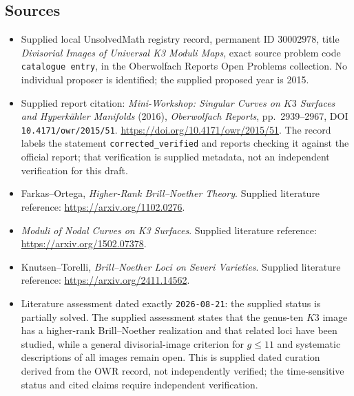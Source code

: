 \documentclass[11pt]{article}
\begin{document}
\subsection{Sources}
\begin{itemize}
\item Supplied local UnsolvedMath registry record, permanent ID \(30002978\), title \emph{Divisorial Images of Universal K3 Moduli Maps}, exact source problem code \texttt{catalogue entry}, in the Oberwolfach Reports Open Problems collection. No individual proposer is identified; the supplied proposed year is 2015.
\item Supplied report citation: \emph{Mini-Workshop: Singular Curves on \(K3\) Surfaces and Hyperkähler Manifolds} (2016), \emph{Oberwolfach Reports}, pp.\ 2939--2967, DOI \texttt{10.4171/owr/2015/51}. \url{https://doi.org/10.4171/owr/2015/51}. The record labels the statement \texttt{corrected\_verified} and reports checking it against the official report; that verification is supplied metadata, not an independent verification for this draft.
\item Farkas--Ortega, \emph{Higher-Rank Brill--Noether Theory}. Supplied literature reference: \url{https://arxiv.org/1102.0276}.
\item \emph{Moduli of Nodal Curves on K3 Surfaces}. Supplied literature reference: \url{https://arxiv.org/1502.07378}.
\item Knutsen--Torelli, \emph{Brill--Noether Loci on Severi Varieties}. Supplied literature reference: \url{https://arxiv.org/2411.14562}.
\item Literature assessment dated exactly \texttt{2026-08-21}: the supplied status is partially solved. The supplied assessment states that the genus-ten \(K3\) image has a higher-rank Brill--Noether realization and that related loci have been studied, while a general divisorial-image criterion for \(g\leq 11\) and systematic descriptions of all images remain open. This is supplied dated curation derived from the OWR record, not independently verified; the time-sensitive status and cited claims require independent verification.
\end{itemize}
\end{document}

